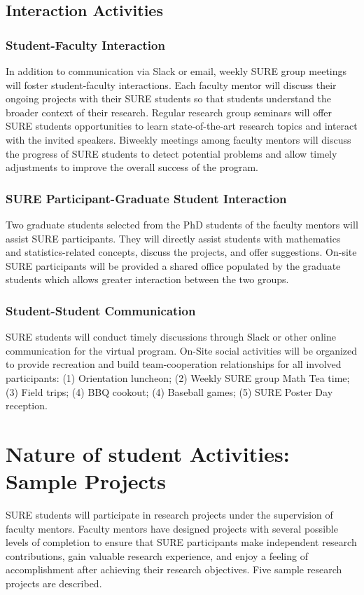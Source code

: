\documentclass[11pt]{NSFamsart}
\begin{document}
\subsection{Interaction Activities}
\subsubsection{Student-Faculty Interaction}
In addition to communication via Slack or email, weekly SURE group meetings will foster student-faculty interactions.  Each
faculty mentor will discuss their ongoing projects with their SURE students so that students understand the broader context of their research. Regular research group seminars
will offer SURE students opportunities to learn state-of-the-art research topics and interact
with the invited speakers.
Biweekly meetings among faculty mentors
will discuss the progress of SURE students to detect potential problems and allow
timely adjustments to improve the overall success of the program.

\subsubsection{SURE Participant-Graduate Student Interaction}
Two graduate students selected from the PhD students
of the faculty mentors will assist SURE participants. They will
directly assist students with mathematics and statistics-related
concepts, discuss the projects, and offer suggestions. On-site SURE participants will be provided
a shared office populated by the graduate students which
allows greater interaction between the two groups. 

\subsubsection{Student-Student Communication}
SURE students will conduct timely discussions through Slack or
other online communication for the virtual program.
On-Site social activities will be organized to provide recreation
and build team-cooperation relationships for all involved participants: (1) Orientation luncheon; (2) Weekly SURE group Math Tea time; (3) Field trips; (4) BBQ
cookout; (4) Baseball games;  (5) SURE Poster Day reception.

\section{Nature of student Activities: Sample Projects }
SURE students will participate in research projects under the supervision of faculty mentors. Faculty
mentors have designed projects with several possible levels of completion to ensure that SURE participants
make independent research contributions, gain valuable research experience, and enjoy a feeling of
accomplishment after achieving their research objectives. Five sample research projects are described.
%
\end{document}
